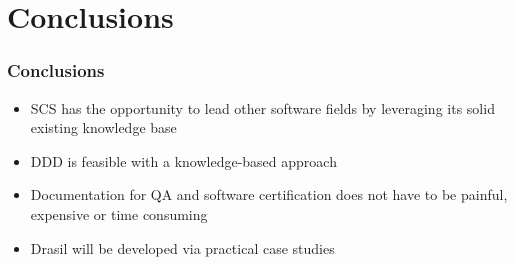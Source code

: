\documentclass{beamer}
\begin{document}

\section[Conclusions]{Conclusions}


\begin{frame}

\frametitle{Conclusions}

\begin{itemize}
\item SCS has the opportunity to lead other software fields by leveraging its
  solid existing knowledge base
\item DDD is feasible with a knowledge-based approach
\item Documentation for QA and software certification does not have to be
  painful, expensive or time consuming
\item Drasil will be developed via practical case studies
\end{itemize}
\end{frame}

\end{document}
